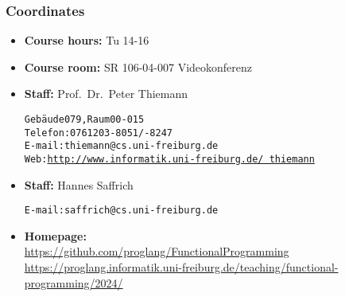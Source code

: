 \documentclass{beamer}
\begin{document}
\begin{frame}
  \titlepage
\end{frame}

\begin{frame}[fragile]
  \frametitle{Coordinates}
  \begin{itemize}
  \item \textbf{Course hours:}  Tu 14-16
  \item \textbf{Course room:} SR 106-04-007 Videokonferenz
  \item \textbf{Staff:} Prof.\ Dr.\ Peter Thiemann\\
\begin{alltt}
Gebäude 079, Raum 00-015
Telefon: 0761 203 -8051/-8247
E-mail: thiemann@cs.uni-freiburg.de
Web: \href{http://www.informatik.uni-freiburg.de/~thiemann}{http://www.informatik.uni-freiburg.de/~thiemann}
\end{alltt}
\item  \textbf{Staff:} Hannes Saffrich\\
\begin{alltt}
E-mail: saffrich@cs.uni-freiburg.de
\end{alltt}
  \item\textbf{Homepage:}\\ \footnotesize
    \href{https://github.com/proglang/FunctionalProgramming}{
      https://github.com/proglang/FunctionalProgramming}
    \\
    \href{https://proglang.informatik.uni-freiburg.de/teaching/functional-programming/2024/}{
      https://proglang.informatik.uni-freiburg.de/teaching/functional-programming/2024/}
  \end{itemize}
\end{frame}
\end{document}
